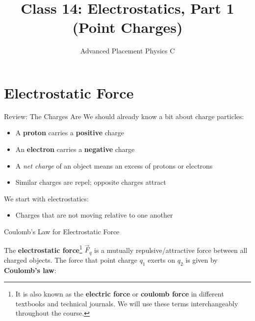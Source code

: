 \documentclass[12pt,aspectratio=169]{beamer}
\title{Class 14: Electrostatics, Part 1 (Point Charges)}
\subtitle{Advanced Placement Physics C}
\begin{document}
\begin{frame}
  \maketitle
\end{frame}


\section{Electrostatic Force}

\begin{frame}{Review: The Charges Are}
  We should already know a bit about charge particles:
  \begin{itemize}
  \item A \textbf{proton} carries a \textbf{positive} charge
  \item An \textbf{electron} carries a \textbf{negative} charge
  \item A \emph{net charge} of an object means an excess of protons or electrons
  \item Similar charges are repel; opposite charges attract
  \end{itemize}

  \vspace{.2in}We start with electrostatics:
  \begin{itemize}
  \item Charges that are not moving relative to one another
  \end{itemize}
\end{frame}



\begin{frame}{Coulomb's Law for Electrostatic Force}
  \begin{center}
  \end{center}
  The \textbf{electrostatic force}\footnote{It is also known as the
  \textbf{electric force} or \textbf{coulomb force} in different textbooks and
  technical journals. We will use these terms interchangeably throughout the
  course.} $\vec F_q$ is a mutually repulsive/attractive force between all
  charged objects. The force that point charge $q_1$ exerts on $q_2$ is given
  by \textbf{Coulomb's law}:

  \vspace{.2in}
  
\end{frame}
\end{document}
